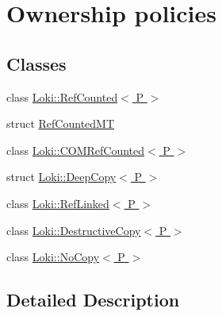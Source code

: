 \hypertarget{group__SmartPointerOwnershipGroup}{}\section{Ownership policies}
\label{group__SmartPointerOwnershipGroup}
\subsection*{Classes}
\begin{DoxyCompactItemize}
\item 
class \hyperlink{classLoki_1_1RefCounted}{Loki\+::\+Ref\+Counted$<$ P $>$}
\item 
struct \hyperlink{structRefCountedMT}{Ref\+Counted\+M\+T}
\item 
class \hyperlink{classLoki_1_1COMRefCounted}{Loki\+::\+C\+O\+M\+Ref\+Counted$<$ P $>$}
\item 
struct \hyperlink{structLoki_1_1DeepCopy}{Loki\+::\+Deep\+Copy$<$ P $>$}
\item 
class \hyperlink{classLoki_1_1RefLinked}{Loki\+::\+Ref\+Linked$<$ P $>$}
\item 
class \hyperlink{classLoki_1_1DestructiveCopy}{Loki\+::\+Destructive\+Copy$<$ P $>$}
\item 
class \hyperlink{classLoki_1_1NoCopy}{Loki\+::\+No\+Copy$<$ P $>$}
\end{DoxyCompactItemize}


\subsection{Detailed Description}
